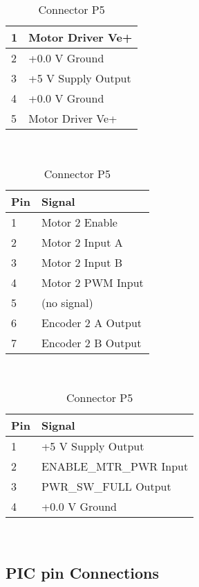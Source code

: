 \documentclass[11pt,a4paper]{article}
\begin{document}
\begin{table}[h]
\begin{minipage}{0.45\textwidth}
\begin{tabular}[b]{|l|l|}
      \hline 1 & Motor Driver Ve+\\
      \hline 2 & +0.0 V Ground\\
      \hline 3 & +5 V Supply Output\\
      \hline 4 & +0.0 V Ground\\
      \hline 5 & Motor Driver Ve+\\
      \hline
    \end{tabular}
    \caption{Connector P3}
\\  \end{minipage}\hfill
    \begin{minipage}{0.45\textwidth}
    \begin{tabular}[b]{|l|l|}
      \hline \textbf{Pin} & \textbf{Signal}\\
      \hline 1 & Motor 2 Enable\\
      \hline 2 & Motor 2 Input A\\
      \hline 3 & Motor 2 Input B\\
      \hline 4 & Motor 2 PWM Input\\
      \hline 5 & (no signal)\\
      \hline 6 & Encoder 2 A Output\\
      \hline 7 & Encoder 2 B Output\\
      \hline
    \end{tabular}
    \caption{Connector P4}
\\  \end{minipage}\hfill
    \begin{minipage}{0.45\textwidth}
    \begin{tabular}[b]{|l|l|}
      \hline \textbf{Pin} & \textbf{Signal}\\
      \hline 1 & +5 V Supply Output\\
      \hline 2 & ENABLE_MTR_PWR Input\\
      \hline 3 & PWR_SW_FULL Output\\
      \hline 4 & +0.0 V Ground     \\
      \hline
    \end{tabular}
    \caption{Connector P5}
\\  \end{minipage}\hfill
  \end{table}

\subsection{PIC pin Connections}
  \label{appA:PIC pin Connections}
\end{document}
